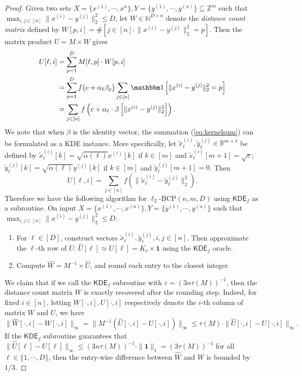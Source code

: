 \documentclass[10pt,a4paper]{article}
\theoremstyle{remark}
\numberwithin{equation}{section}
\numberwithin{theorem}{section}
\newcommand{\N}{\ensuremath{\mathbb{N}}}
\newcommand{\R}{\ensuremath{\mathbb{R}}}
\newcommand{\Z}{\ensuremath{\mathbb{Z}}}
\newcommand{\eps}{\varepsilon}
\newcommand{\ind}{\mathbbm 1}
\newcommand{\bo}{\boldsymbol 1}
\newcommand{\KDE}{\mathsf{KDE}}
\begin{document}
\begin{proof}
Given two sets $X = \{x^{(1)}, \cdots, x^{n}\}, Y = \{y^{(1)}, \cdots, y^{(n)}\} \subseteq \Z^m$ such that $\max_{i, j \in [n]} \|x^{(i)} - y^{(j)}\|_2^2 \le D$, let $W \in \N^{D \times n}$ denote the \emph{distance count matrix} defined by $W[p, i] = \#[j \in [n]: \|x^{(i)} - y^{(j)}\|_2^2 = p]$. Then the matrix product $U = M \times W$ gives
\begin{align}
U[\ell, i] &= \sum_{p=1}^D M[\ell, p] \cdot W[p, i] \notag\\ 
&=\sum_{p=1}^D f\big(c + \alpha_\ell\beta_p\big) 
\sum_{j \in [n]} \ind\left[\|x^{(i)} - y^{(j)}\|_2^2 = p\right] \notag\\
&=\sum_{j \in [n]} f\left(c + \alpha_\ell \cdot \beta\left[\|x^{(i)} - y^{(j)}\|_2^2\right]\right). \label{eq:kernelsum} 
\end{align}
We note that when $\beta$ is the identity vector, the summation (\ref{eq:kernelsum}) can be formulated as a KDE instance.
More specifically, let $\tilde x_{\ell}^{(i)}, \tilde y_{\ell}^{(j)} \in \R^{m+1}$ be defined by $\tilde x_{\ell}^{(i)}[k] = \sqrt{\alpha(\ell)} x^{(i)}[k]$ if $k \in [m]$ and $\tilde x_{\ell}^{(i)}[m+1] = \sqrt c$;
$\tilde y_{\ell}^{(j)}[k] = \sqrt{\alpha(\ell)} y^{(j)}[k]$ if $k \in [m]$ and $\tilde y_{\ell}^{(j)}[m+1] = 0$. Then
\[U[\ell, i] = \sum_{j \in [n]} f(\|\tilde x_{\ell}^{(i)} - \tilde y_{\ell}^{(j)}\|_2^2).\]
Therefore we have the following algorithm for $\ell_2$\textsf{-BCP}$(n, m, D)$ using $\KDE_f$ as a subroutine. 
On input $X = \{x^{(1)}, \cdots, x^{(n)}\}, Y = \{y^{(1)}, \cdots, y^{(n)}\}$ such that $\max_{i, j \in [n]} \|x^{(i)} - y^{(j)}\|_2^2 \le D$:
\begin{enumerate}
\item For $\ell \in [D]$, construct vectors $\tilde x_{\ell}^{(i)}, \tilde y^{(j)}_{\ell}, i, j \in [n]$.
Then approximate the $\ell$-th row of $U$: $\hat U[\ell] \approx U[\ell] = K_{\ell} \times \bo$ using the $\KDE_f$ oracle.
\item Compute $\hat W = M^{-1} \times \hat U$, and round each entry to the closest integer.
\end{enumerate}

We claim that if we call the $\KDE_f$ subroutine with $\eps = (3n\tau(M))^{-1}$, then the distance count matrix $W$ is exactly recovered after the rounding step.
Indeed, for fixed $i \in [n]$, letting $W[\cdot, i], U[\cdot, i]$ respectively denote the $i$-th column of matrix $W$ and $U$, we have
\[\|\hat W[\cdot, i] - W[\cdot, i]\|_{\infty}
=\|M^{-1}(\hat U[\cdot, i] - U[\cdot, i])\|_{\infty}
\le \tau(M) \cdot \|\hat U[\cdot, i] - U[\cdot, i]\|_{\infty}.\]
If the $\KDE_f$ subroutine guarantees that $\|\hat U[\ell] - U[\ell]\|_{\infty} \le (3n\tau(M))^{-1} \cdot \|\bo\|_{1} = (3\tau(M))^{-1}$ for all $\ell \in \{1, \cdots, D\}$, then the entry-wise difference between $\hat W$ and $W$ is bounded by $1/3$.


\end{proof}
\end{document}
